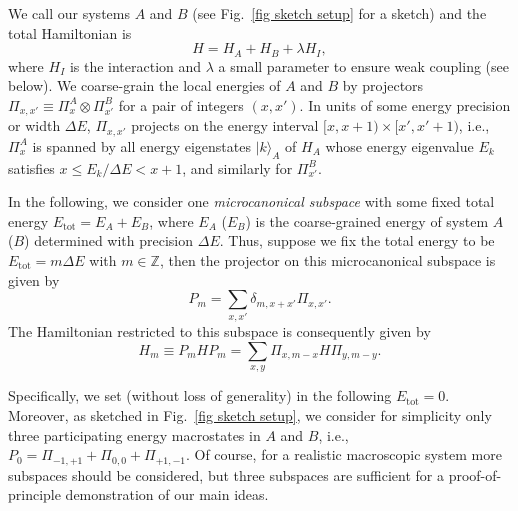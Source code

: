 \documentclass[pre,twocolumn,10pt,aps,longbibliography,nofootinbib]{revtex4-1}
\begin{document}
We call our systems $A$ and $B$ (see Fig.~\ref{fig sketch setup} for a sketch) and the total Hamiltonian is
\begin{equation}\label{eq H mic}
 H = H_A + H_B + \lambda H_I,
\end{equation}
where $H_I$ is the interaction and $\lambda$ a small parameter to ensure weak coupling (see below). We coarse-grain the local energies of $A$ and $B$ by projectors $\Pi_{x,x'} \equiv \Pi_x^A\otimes\Pi_{x'}^B$ for a pair of integers $(x,x')$. In units of some energy precision or width $\Delta E$, $\Pi_{x,x'}$ projects on the energy interval $[x,x+1)\times[x',x'+1)$, i.e., $\Pi_x^A$ is spanned by all energy eigenstates $|k\rangle_A$ of $H_A$ whose energy eigenvalue $E_k$ satisfies $x\le E_k/\Delta E < x+1$, and similarly for $\Pi_{x'}^B$.

In the following, we consider one \emph{microcanonical subspace} with some fixed total energy 
$E_\text{tot} = E_A + E_B$, where $E_A$ ($E_B$) is the coarse-grained energy of system $A$ ($B$) determined with 
precision $\Delta E$. Thus, suppose we fix the total energy to be $E_\text{tot} = m\Delta E$ with $m\in\mathbb{Z}$, 
then the projector on this microcanonical subspace is given by
\begin{equation}
 P_{m} = \sum_{x,x'} \delta_{m,x+x'}\Pi_{x,x'}.
\end{equation}
The Hamiltonian restricted to this subspace is consequently given by
\begin{equation}\label{eq H rest}
 H_m \equiv P_{m} H P_{m} = \sum_{x,y} \Pi_{x,m-x} H \Pi_{y,m-y}.
\end{equation}

Specifically, we set (without loss of generality) in the following $E_\text{tot} = 0$. Moreover, as sketched in Fig.~\ref{fig sketch setup}, we consider for simplicity only three participating energy macrostates in $A$ and $B$, i.e., $P_0 = \Pi_{-1,+1} + \Pi_{0,0} + \Pi_{+1,-1}$. Of course, for a realistic macroscopic system more subspaces should be considered, but three subspaces are sufficient for a proof-of-principle demonstration of our main ideas.
\end{document}
